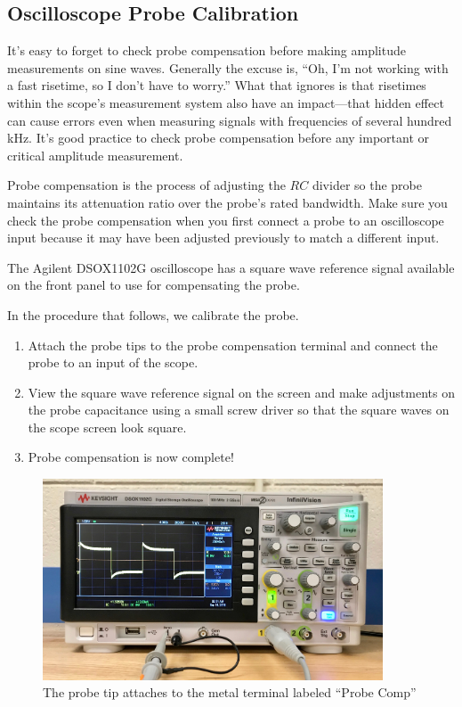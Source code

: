 \documentclass[12pt]{../manual}
\begin{document}
\subsection{Oscilloscope Probe Calibration}
It's easy to forget to check probe compensation before making amplitude measurements on sine waves. Generally the excuse is, ``Oh, I'm not working with a fast risetime, so I don't have to worry.''  What that ignores is that risetimes within the scope's measurement system also have an impact---that hidden effect can cause errors even when measuring signals with frequencies of several hundred kHz. It's good practice to check probe compensation before any important or critical amplitude measurement. 

Probe compensation is the process of adjusting the $RC$ divider so the probe maintains its attenuation ratio over the probe's rated bandwidth. Make sure you check the probe compensation when you first connect a probe to an oscilloscope input because it may have been adjusted previously to match a different input.   

The Agilent DSOX1102G oscilloscope has a square wave reference signal available on the front panel to use for compensating the probe.

In the procedure that follows, we calibrate the probe.
\begin{enumerate}
\item Attach the probe tips to the probe compensation terminal and connect the probe to an input of the scope. 
\item View the square wave reference signal on the screen and make adjustments on the probe capacitance using a small screw driver so that the square waves on the scope screen look square.
\item Probe compensation is now complete!
\end{enumerate}

\begin{figure}[ht!]
\begin{center}
\centering
\includegraphics[width=0.9\textwidth]{figures/OscProbeComp.jpeg}
\caption[Oscilloscope Probe Calibration]{The probe tip attaches to the metal terminal labeled ``Probe Comp''}
\label{fig:oscprobecomp}
\end{center}
\end{figure}
\end{document}

